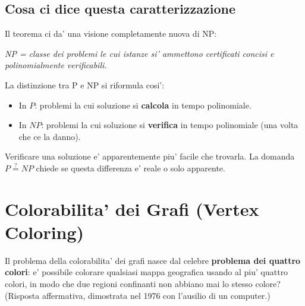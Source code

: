 \subsection{Cosa ci dice questa caratterizzazione}

Il teorema ci da' una visione completamente nuova di NP:

\begin{center}
  \textit{NP = classe dei problemi le cui istanze si' ammettono certificati concisi e polinomialmente verificabili.}
\end{center}

La distinzione tra P e NP si riformula cosi':
\begin{itemize}
  \item In $P$: problemi la cui soluzione si \textbf{calcola} in tempo polinomiale.
  \item In $NP$: problemi la cui soluzione si \textbf{verifica} in tempo polinomiale (una volta che ce la danno).
\end{itemize}

Verificare una soluzione e' apparentemente piu' facile che trovarla. La domanda $P \overset{?}{=} NP$ chiede se questa differenza e' reale o solo apparente.


\section{Colorabilita' dei Grafi (Vertex Coloring)}

Il problema della colorabilita' dei grafi nasce dal celebre \textbf{problema dei quattro colori}: e' possibile colorare qualsiasi mappa geografica usando al piu' quattro colori, in modo che due regioni confinanti non abbiano mai lo stesso colore? (Risposta affermativa, dimostrata nel 1976 con l'ausilio di un computer.)

